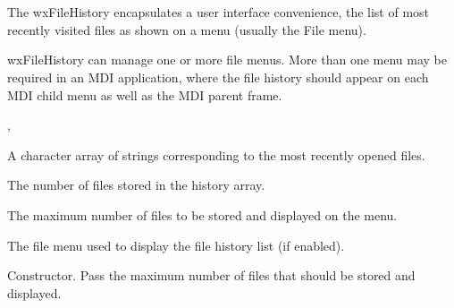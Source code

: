 \section{}\label{wxfilehistory}

The wxFileHistory encapsulates a user interface convenience, the
list of most recently visited files as shown on a menu (usually the File menu).

wxFileHistory can manage one or more file menus. More than one menu may be required
in an MDI application, where the file history should appear on each MDI child menu
as well as the MDI parent frame.




, 




A character array of strings corresponding to the most recently opened
files.



The number of files stored in the history array.



The maximum number of files to be stored and displayed on the menu.



The file menu used to display the file history list (if enabled).



Constructor. Pass the maximum number of files that should be stored and displayed.



